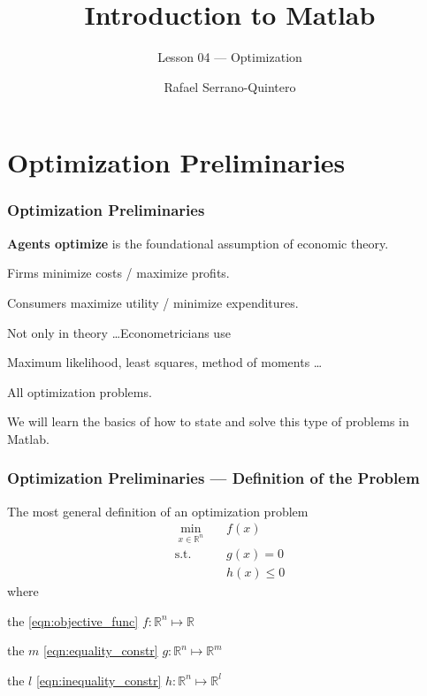 \documentclass[11pt,xcolor={svgnames},aspectratio=169,usepdftitle=false]{beamer}
\title{Introduction to Matlab}
\subtitle{Lesson 04 --- Optimization}
\author{Rafael Serrano-Quintero}
\institute{Department of Economics \\ University of Barcelona}
\date{}
\let\toneitemize\itemize
\let\ttwoitemize\enditemize
\renewenvironment{itemize}{\toneitemize\addtolength{\itemsep}{0.7\baselineskip}}{\ttwoitemize}
\begin{document}
\VerbatimFootnotes

\maketitle

\section{Optimization Preliminaries}

\begin{frame}
  \frametitle{Optimization Preliminaries}
\begin{itemize}
  \item \alert{\textbf{Agents optimize}} is the foundational assumption of economic theory.
  \begin{itemize}
    \item Firms minimize costs / maximize profits.
    \item Consumers maximize utility / minimize expenditures.
  \end{itemize}
  \item Not only in theory \ldots Econometricians use
  \begin{itemize}
    \item Maximum likelihood, least squares, method of moments \ldots
    \item All optimization problems.
  \end{itemize}
  \item We will learn the basics of how to state and solve this type of problems in Matlab.
\end{itemize}
\end{frame}

\begin{frame}
  \frametitle{Optimization Preliminaries --- Definition of the Problem}
The most general definition of an optimization problem
\begin{align}
  \underset{x\in\mathbb{R}^n}{\min} \phantom{\Omega} &   f(x) \tag{Objective Function} \label{eqn:objective_func} \\
  \text{s.t. } & g(x) = 0 \tag{Equality Constraints} \label{eqn:equality_constr} \\
  \phantom{\text{s.t.}} & h(x) \leq 0 \tag{Inequality Constraints} \label{eqn:inequality_constr}
\end{align}
where
\begin{itemize}
  \item the \ref{eqn:objective_func} $f :\mathbb{R}^n\mapsto \mathbb{R}$
  \item the $m$ \ref{eqn:equality_constr} $g :\mathbb{R}^n\mapsto \mathbb{R}^m$
  \item the $l$ \ref{eqn:inequality_constr} $h :\mathbb{R}^n\mapsto \mathbb{R}^l$
\end{itemize}
\end{frame}
\end{document}
